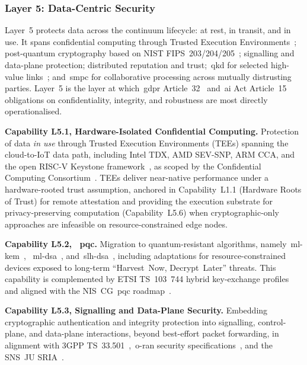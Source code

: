 \documentclass{ieeeaccess}
\begin{document}
\subsubsection{Layer 5: Data-Centric Security}
\label{sec:L5}

Layer~5 protects data across the continuum lifecycle: at rest, in transit, and in use. It spans confidential computing through Trusted Execution Environments~\cite{ccc2022}; post-quantum cryptography based on NIST FIPS~203/204/205~\cite{nistfips203,nistfips204,nistfips205}; signalling and data-plane protection; distributed reputation and trust;~\gls{qkd} for selected high-value links~\cite{etsiqkd014,etsiqkd004}; and~\gls{smpc} for collaborative processing across mutually distrusting parties. Layer~5 is the layer at which~\gls{gdpr} Article~32~\cite{eugdpr} and~\gls{ai} Act Article~15~\cite{euaiact} obligations on confidentiality, integrity, and robustness are most directly operationalised.

\textbf{Capability L5.1, Hardware-Isolated Confidential Computing.} Protection of data \emph{in use} through Trusted Execution Environments (TEEs) spanning the cloud-to-IoT data path, including Intel TDX, AMD SEV-SNP, ARM CCA, and the open RISC-V Keystone framework~\cite{keystone2020}, as scoped by the Confidential Computing Consortium~\cite{ccc2022}. TEEs deliver near-native performance under a hardware-rooted trust assumption, anchored in Capability~L1.1 (Hardware Roots of Trust) for remote attestation and providing the execution substrate for privacy-preserving computation (Capability~L5.6) when cryptographic-only approaches are infeasible on resource-constrained edge nodes.

\textbf{Capability L5.2, ~\acrfull{pqc}.} Migration to quantum-resistant algorithms, namely~\gls{ml-kem}~\cite{nistfips203}, ~\gls{ml-dsa}~\cite{nistfips204}, and~\gls{slh-dsa}~\cite{nistfips205}, including adaptations for resource-constrained devices exposed to long-term ``Harvest~Now, Decrypt~Later'' threats. This capability is complemented by ETSI TS~103~744 hybrid key-exchange profiles~\cite{etsiqshybrid} and aligned with the NIS~CG~\gls{pqc} roadmap~\cite{niscg2025pqc}.

\textbf{Capability L5.3, Signalling and Data-Plane Security.} Embedding cryptographic authentication and integrity protection into signalling, control-plane, and data-plane interactions, beyond best-effort packet forwarding, in alignment with 3GPP TS~33.501~\cite{tgpp33501},~\gls{o-ran} security specifications~\cite{oran2024,oranzt2024}, and the SNS~JU SRIA~\cite{snsju2023}.
\end{document}
